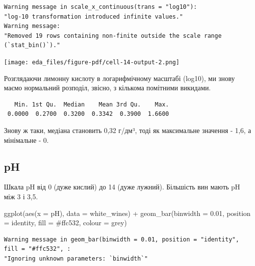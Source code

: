 \documentclass[
  letterpaper,
  DIV=11,
  numbers=noendperiod]{scrreprt}
\newenvironment{Shaded}{\begin{snugshade}}{\end{snugshade}}
\newcommand{\AttributeTok}[1]{\textcolor[rgb]{0.40,0.45,0.13}{#1}}
\newcommand{\FloatTok}[1]{\textcolor[rgb]{0.68,0.00,0.00}{#1}}
\newcommand{\FunctionTok}[1]{\textcolor[rgb]{0.28,0.35,0.67}{#1}}
\newcommand{\NormalTok}[1]{\textcolor[rgb]{0.00,0.23,0.31}{#1}}
\newcommand{\SpecialCharTok}[1]{\textcolor[rgb]{0.37,0.37,0.37}{#1}}
\newcommand{\StringTok}[1]{\textcolor[rgb]{0.13,0.47,0.30}{#1}}
\begin{document}
\begin{verbatim}
Warning message in scale_x_continuous(trans = "log10"):
"log-10 transformation introduced infinite values."
Warning message:
"Removed 19 rows containing non-finite outside the scale range (`stat_bin()`)."
\end{verbatim}

\texttt{[image: eda\_files/figure-pdf/cell-14-output-2.png]}

Розглядаючи лимонну кислоту в логарифмічному масштабі (log10), ми знову
маємо нормальний розподіл, звісно, з кількома помітними викидами.

\begin{Shaded}
\end{Shaded}

\begin{verbatim}
   Min. 1st Qu.  Median    Mean 3rd Qu.    Max. 
 0.0000  0.2700  0.3200  0.3342  0.3900  1.6600 
\end{verbatim}

Знову ж таки, медіана становить 0,32 г/дм³, тоді як максимальне значення
- 1,6, а мінімальне - 0.

\subsection{pH}\label{ph}

Шкала pH від 0 (дуже кислий) до 14 (дуже лужний). Більшість вин мають pH
між 3 і 3,5.

\begin{Shaded}
\begin{Highlighting}[]
\FunctionTok{ggplot}\NormalTok{(}\FunctionTok{aes}\NormalTok{(}\AttributeTok{x =}\NormalTok{ pH), }\AttributeTok{data =}\NormalTok{ white\_wines) }\SpecialCharTok{+}
  \FunctionTok{geom\_bar}\NormalTok{(}\AttributeTok{binwidth =} \FloatTok{0.01}\NormalTok{, }\AttributeTok{position =} \StringTok{\textquotesingle{}identity\textquotesingle{}}\NormalTok{, }\AttributeTok{fill =} \StringTok{\textquotesingle{}\#ffc532\textquotesingle{}}\NormalTok{, }\AttributeTok{colour =} \StringTok{\textquotesingle{}grey\textquotesingle{}}\NormalTok{)}
\end{Highlighting}
\end{Shaded}

\begin{verbatim}
Warning message in geom_bar(binwidth = 0.01, position = "identity", fill = "#ffc532", :
"Ignoring unknown parameters: `binwidth`"
\end{verbatim}
\end{document}
